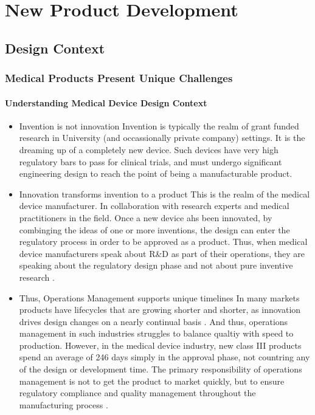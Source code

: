 \section{New Product Development}
\subsection{Design Context}
\begin{frame}
  \frametitle{Medical Products Present Unique Challenges}
  \framesubtitle{Understanding Medical Device Design Context}
  \begin{itemize}
    \item<1-> Invention is not innovation
       {\scriptsize{Invention is typically the realm of grant funded research in University (and occassionally private company) settings. It is the dreaming up of a completely new device. Such devices have very high regulatory bars to pass for clinical trials, and must undergo significant engineering design to reach the point of being a manufacturable product. }}

    \item<2-> Innovation transforms invention to a product
       {\scriptsize{This is the realm of the medical device manufacturer. In collaboration with research experts and medical practitioners in the field. Once a new device ahs been innovated, by combinging the ideas of one or more inventions, the design can enter the regulatory process in order to be approved as a product. Thus, when medical device manufacturers speak about R\&D as part of their operations, they are speaking about the regulatory design phase and not about pure inventive research \parencite{dasUseManufacturingTechnologiesan2010}.}}

    \item<3-> Thus, Operations Management supports unique timelines
       {\scriptsize{In many markets products have lifecycles that are growing shorter and shorter, as innovation drives design changes on a nearly continual basis \parencite{basallo-trianaAnaloguebasedDemandForecasting2017}. And thus, operations management in such industries struggles to balance qualtiy with speed to production. However, in the medical device industry, new class III products spend an average of 246 days simply in the approval phase, not countring any of the design or development time. The primary responsibility of operations management is not to get the product to market quickly, but to ensure regulatory compliance and quality management throughout the manufacturing process \parencite{dasUseManufacturingTechnologiesan2010}.}}

  \end{itemize}
\end{frame}

